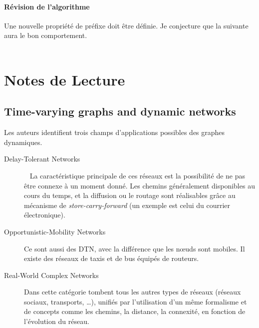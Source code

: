 \documentclass[12pt,a4paper]{article}
\begin{document}
\paragraph{Révision de l'algorithme}
Une nouvelle propriété de préfixe doit être définie. Je conjecture que
la suivante aura le bon comportement.\\
\noindent
{}\\

\section{Notes de Lecture}
\subsection{Time-varying graphs and dynamic
  networks~\cite{DBLP:journals/paapp/CasteigtsFQS12}}
Les auteurs identifient trois champs d'applications possibles des
graphes dynamiques.
\begin{description}
\item[Delay-Tolerant Networks]~\cite{DBLP:journals/rfc/rfc4838} La
  caractéristique principale de ces réseaux est la possibilité de ne
  pas être connexe à un moment donné. Les chemins généralement
  disponibles au cours du temps, et la diffusion ou le routage sont
  réalisables grâce au mécanisme de \textit{store-carry-forward} (un
  exemple est celui du courrier électronique).
\item[Opportunistic-Mobility Networks] Ce sont aussi des DTN, avec la
  différence que les nœuds sont mobiles. Il existe des réseaux de
  taxis et de bus équipés de routeurs.
\item[Real-World Complex Networks] Dans cette catégorie tombent tous
  les autres types de réseaux (réseaux sociaux, transports, …),
  unifiés par l'utilisation d'un même formalisme et de concepts comme
  les chemins, la distance, la connexité, en fonction de l'évolution
  du réseau.
\end{description}
\end{document}
